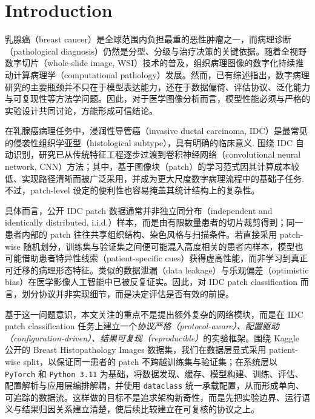 \section{Introduction}
\label{sec:introduction}

乳腺癌（breast cancer）是全球范围内负担最重的恶性肿瘤之一，而病理诊断（pathological diagnosis）仍然是分型、分级与治疗决策的关键依据。随着全视野数字切片（whole-slide image, WSI）技术的普及，组织病理图像的数字化持续推动计算病理学（computational pathology）发展。然而，已有综述指出，数字病理研究的主要瓶颈并不只在于模型表达能力，还在于数据偏倚、评估协议、泛化能力与可复现性等方法学问题\cite{vanDerLaak2021,Komura2018,McGenity2024}。因此，对于医学图像分析而言，模型性能必须与严格的实验设计共同讨论，方能形成可信结论。

在乳腺癌病理任务中，浸润性导管癌（invasive ductal carcinoma, IDC）是最常见的侵袭性组织学亚型（histological subtype），具有明确的临床意义\cite{Malhotra2010,Neagu2023}. 围绕 IDC 自动识别，研究已从传统特征工程逐步过渡到卷积神经网络（convolutional neural network, CNN）方法；其中，基于图像块（patch）的学习范式因其计算成本较低、实现路径清晰而被广泛采用，并成为更大尺度数字病理流程中的基础子任务\cite{CruzRoa2014,Abdolahi2020}. 不过，patch-level 设定的便利性也容易掩盖其统计结构上的复杂性。

具体而言，公开 IDC patch 数据通常并非独立同分布（independent and identically distributed, i.i.d.）样本，而是由有限数量患者的切片裁剪得到；同一患者内部的 patch 往往共享组织结构、染色风格与扫描条件。若直接采用 patch-wise 随机划分，训练集与验证集之间便可能混入高度相关的患者内样本，模型也可能借助患者特异性线索（patient-specific cues）获得虚高性能，而非学习到真正可迁移的病理形态特征。类似的数据泄漏（data leakage）与乐观偏差（optimistic bias）在医学影像人工智能中已被反复证实\cite{Yagis2021,Tampu2022,Rosenblatt2024}。因此，对 IDC patch classification 而言，划分协议并非实现细节，而是决定评估是否有效的前提。

基于这一问题意识，本文关注的重点不是提出额外复杂的网络模块，而是在 IDC patch classification 任务上建立一个\emph{协议严格（protocol-aware）、配置驱动（configuration-driven）、结果可复现（reproducible）}的实验框架。围绕 Kaggle 公开的 Breast Histopathology Images 数据集，我们在数据层显式采用 patient-wise split，以保证同一患者的 patch 不跨越训练集与验证集；在系统层以 \texttt{PyTorch} 和 \texttt{Python~3.11} 为基础，将数据发现、缓存、模型构建、训练、评估、配置解析与应用层编排解耦，并使用 \texttt{dataclass} 统一承载配置，从而形成单向、可追踪的数据流。这样做的目标不是追求架构新奇性，而是先把实验边界、运行语义与结果归因关系建立清楚，使后续比较建立在可复核的协议之上。

